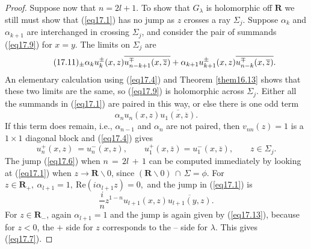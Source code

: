 \documentclass{surv-l}
\theoremstyle{plain}
\theoremstyle{definition}
\numberwithin{equation}{chapter}
\begin{document}
\begin{proof}
Suppose now that $n=2l+1$. To show that $G_{\lambda}$ is holomorphic off $\mathbf{R}$ we still must show that (\ref{eq17.1}) has no jump as $z$ crosses a ray $\Sigma_{j}$. Suppose $\alpha_{k}$ and $\alpha_{k+1}$ are interchanged in crossing $\Sigma_{j}$, and consider the pair of summands (\ref{eq17.9}) for $x=y$. The limits on $\Sigma_{j}$ are
\begin{equation*}
\tag*{$(17.11)_{\pm}$}\alpha_{k}u_{k}^{\pm}(x,z)\overline{u_{n-k+1}^{\mp}(x, \overline{z})}+\alpha_{k+1}u_{k+1}^{\pm}(x,z)\overline{u_{n-k}^{\mp}(x, \overline{z})}.
\end{equation*}
An elementary calculation using (\ref{eq17.4}) and Theorem \ref{them16.13} shows that these two limits are the same, so (\ref{eq17.9}) is holomorphic across $\Sigma_{j}$. Either all the summands in (\ref{eq17.1}) are paired in this way, or else there is one odd term
\setcounter{equation}{11}
\begin{equation}\label{eq17.12}
\alpha_{n}u_{n}(x,z)\overline{u_{1}(x,\overline{z})}.
\end{equation}
If this term does remain, i.e., $\alpha_{n-1}$ and $\alpha_{n}$ are not paired, then $v_{nn}(z)=1$ is a $1\times 1$ diagonal block and (\ref{eq17.4}) gives
\begin{equation*}
u_{n}^{+}(x,z)\ =u_{n}^{-}(x, z),\qquad u_{1}^{+}(x,\overline{z})=u_{1}^{-}(x,\overline{z}),\qquad z\in\Sigma_{j}.
\end{equation*}
The jump (\ref{eq17.6}) when $n\,=\,2l\,+\,1$ can be computed immediately by looking at (\ref{eq17.1}) when $z\rightarrow \mathbf{R}\backslash 0$, since $(\mathbf{R}\backslash 0)\,\cap\,\Sigma=\phi$. For $z\in \mathbf{R}_{+},\ \alpha_{l+1}=1,\ \mathrm{Re}(i\alpha_{l+1}z)=0,$ and the jump in (\ref{eq17.1}) is
\begin{equation}\label{eq17.13}
\displaystyle \frac{i}{n}z^{1-n}u_{l+1}(x,z)\overline{u_{l+1}(y,z)}.
\end{equation}
For $z\in \mathbf{R}_{-}$, again $\alpha_{l+1}=1$ and the jump is again given by (\ref{eq17.13}), because for $z<0$, the $+$ side for $z$ corresponds to the -- side for $\lambda$. This gives (\ref{eq17.7}).


\end{proof}
\end{document}
